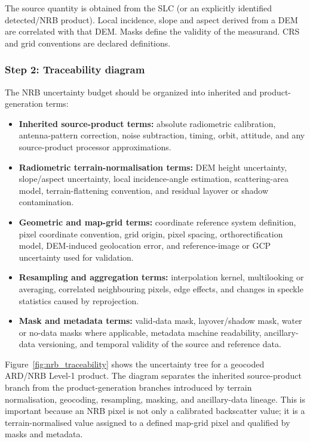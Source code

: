 The source quantity is obtained from the SLC (or an explicitly
identified detected/NRB product). Local incidence, slope and aspect derived from a DEM are correlated with that DEM. Masks define the validity of the measurand. CRS and grid conventions
are declared definitions.

\subsubsection{Step 2: Traceability diagram}

The \ac{NRB} uncertainty budget should be organized into inherited and product-generation terms:
\begin{itemize}
  \item \textbf{Inherited source-product terms:} absolute radiometric calibration, antenna-pattern correction, noise subtraction, timing, orbit, attitude, and any source-product processor approximations.
  \item \textbf{Radiometric terrain-normalisation terms:} \ac{DEM} height uncertainty, slope/aspect uncertainty, local incidence-angle estimation, scattering-area model, terrain-flattening convention, and residual layover or shadow contamination.
  \item \textbf{Geometric and map-grid terms:} coordinate reference system definition, pixel coordinate convention, grid origin, pixel spacing, orthorectification model, \ac{DEM}-induced geolocation error, and reference-image or GCP uncertainty used for validation.
  \item \textbf{Resampling and aggregation terms:} interpolation kernel, multilooking or averaging, correlated neighbouring pixels, edge effects, and changes in speckle statistics caused by reprojection.
  \item \textbf{Mask and metadata terms:} valid-data mask, layover/shadow mask, water or no-data masks where applicable, metadata machine readability, ancillary-data versioning, and temporal validity of the source and reference data.
\end{itemize}

Figure~\ref{fig:nrb_traceability} shows the uncertainty tree for a geocoded
\ac{ARD}/\ac{NRB} Level-1 product. The diagram separates the inherited source-product
branch from the product-generation branches introduced by terrain
normalisation, geocoding, resampling, masking, and ancillary-data lineage. This
is important because an \ac{NRB} pixel is not only a calibrated backscatter value;
it is a terrain-normalised value assigned to a defined map-grid pixel and qualified by masks and metadata.


